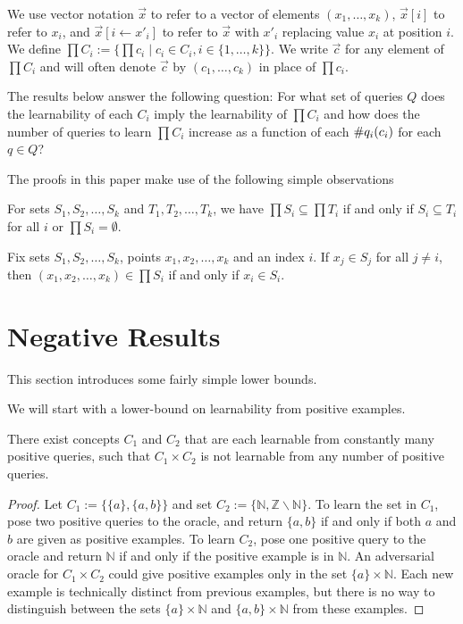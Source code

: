 We use vector notation $\vec{x}$ to refer to a vector of elements $(x_1,\dots, x_k)$, $\vec{x}[i]$ to refer to $x_i$, and $\vec{x}[i \leftarrow x'_i]$ to refer to $\vec{x}$ with $x'_i$ replacing value $x_i$ at position $i$. 
We define $\prod C_i := \{ \prod c_i \mid c_i \in C_i, i \in \{1,\dots,k\} \}$. 
We write $\vec{c}$ for any element of $\prod C_i $ and will often denote $\vec{c}$ by $(c_1, \dots, c_k)$ in place of $\prod c_i$. 

The results below answer the following question:
For what set of queries $Q$ does the learnability of each $C_i$ imply the learnability of $\prod C_i $ and how does the number of queries to learn $\prod C_i $ increase as a function of each $\#q_{i}(c_i)$ for each $q \in Q$?

The proofs in this paper make use of the following simple observations 
\begin{observation}
\label{subobs}
For sets $S_1, S_2, \dots, S_k$ and $T_1, T_2, \dots, T_k$, we have $\prod S_i \subseteq \prod T_i$ if and only if $S_i \subseteq T_i$ for all $i$ or $\prod S_i = \emptyset$.
\end{observation}

\begin{observation}
\label{posobs}
Fix sets $S_1, S_2, \dots, S_k$, points $x_1, x_2, \dots, x_k$ and an index $i$. 
If $x_j \in S_j$ for all $j \ne i$, then $(x_1, x_2, \dots, x_k) \in \prod S_i$ if and only if $x_i \in S_i$.
\end{observation}




\section{Negative Results}
This section introduces some fairly simple lower bounds.

We will start with a lower-bound on learnability from positive examples. 

\begin{proposition}
There exist concepts $C_1$ and $C_2$ that are each learnable from constantly many positive queries, such that $C_1 \times C_2$ is not learnable from any number of positive queries. 
\end{proposition}
\begin{proof}
Let $C_1 := \{ \{a\}, \{a,b\} \}$ and set $C_2 := \{ \mathbb{N}, \mathbb{Z} \backslash \mathbb{N} \}$. 
To learn the set in $C_1$, pose two positive queries to the oracle, and return $\{a,b\}$ if and only if both $a$ and $b$ are given as positive examples. 
To learn $C_2$, pose one positive query to the oracle and return $\mathbb{N}$ if and only if the positive example is in $\mathbb{N}$. 
An adversarial oracle for $C_1 \times C_2$ could give positive examples only in the set $\{a\} \times \mathbb{N}$. 
Each new example is technically distinct from previous examples, but there is no way to distinguish between the sets $\{a\}\times \mathbb{N}$ and $\{a,b\} \times \mathbb{N}$ from these examples. 
\end{proof}


